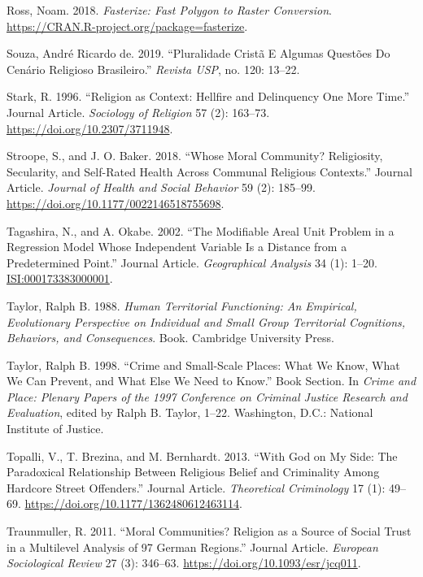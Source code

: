 \documentclass[smallextended]{svjour3}       %
\begin{document}
\leavevmode\hypertarget{ref-Ross2018fasterize}{}%
Ross, Noam. 2018. \emph{Fasterize: Fast Polygon to Raster Conversion}.
\url{https://CRAN.R-project.org/package=fasterize}.

\leavevmode\hypertarget{ref-deSouza2019pluralidade}{}%
Souza, André Ricardo de. 2019. ``Pluralidade Cristã E Algumas Questões
Do Cenário Religioso Brasileiro.'' \emph{Revista USP}, no. 120: 13--22.

\leavevmode\hypertarget{ref-Stark1996religion}{}%
Stark, R. 1996. ``Religion as Context: Hellfire and Delinquency One More
Time.'' Journal Article. \emph{Sociology of Religion} 57 (2): 163--73.
\url{https://doi.org/10.2307/3711948}.

\leavevmode\hypertarget{ref-Stroope2018moral}{}%
Stroope, S., and J. O. Baker. 2018. ``Whose Moral Community?
Religiosity, Secularity, and Self-Rated Health Across Communal Religious
Contexts.'' Journal Article. \emph{Journal of Health and Social
Behavior} 59 (2): 185--99.
\url{https://doi.org/10.1177/0022146518755698}.

\leavevmode\hypertarget{ref-Tagashira2002modifiable}{}%
Tagashira, N., and A. Okabe. 2002. ``The Modifiable Areal Unit Problem
in a Regression Model Whose Independent Variable Is a Distance from a
Predetermined Point.'' Journal Article. \emph{Geographical Analysis} 34
(1): 1--20. \url{ISI:000173383000001}.

\leavevmode\hypertarget{ref-Taylor1988human}{}%
Taylor, Ralph B. 1988. \emph{Human Territorial Functioning: An
Empirical, Evolutionary Perspective on Individual and Small Group
Territorial Cognitions, Behaviors, and Consequences}. Book. Cambridge
University Press.

\leavevmode\hypertarget{ref-Taylor1998crime}{}%
Taylor, Ralph B. 1998. ``Crime and Small-Scale Places: What We Know,
What We Can Prevent, and What Else We Need to Know.'' Book Section. In
\emph{Crime and Place: Plenary Papers of the 1997 Conference on Criminal
Justice Research and Evaluation}, edited by Ralph B. Taylor, 1--22.
Washington, D.C.: National Institute of Justice.

\leavevmode\hypertarget{ref-Topalli2013god}{}%
Topalli, V., T. Brezina, and M. Bernhardt. 2013. ``With God on My Side:
The Paradoxical Relationship Between Religious Belief and Criminality
Among Hardcore Street Offenders.'' Journal Article. \emph{Theoretical
Criminology} 17 (1): 49--69.
\url{https://doi.org/10.1177/1362480612463114}.

\leavevmode\hypertarget{ref-Traunmuller2011moral}{}%
Traunmuller, R. 2011. ``Moral Communities? Religion as a Source of
Social Trust in a Multilevel Analysis of 97 German Regions.'' Journal
Article. \emph{European Sociological Review} 27 (3): 346--63.
\url{https://doi.org/10.1093/esr/jcq011}.
\end{document}
